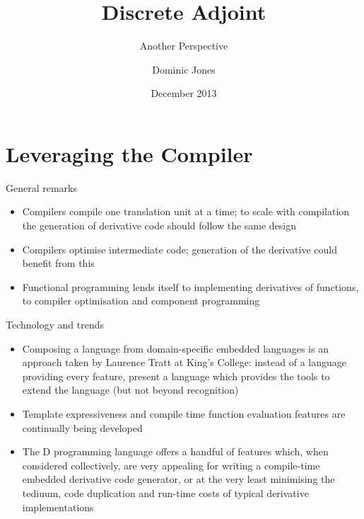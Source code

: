 \documentclass[xcolor=dvipsnames]{beamer}
\title{Discrete Adjoint}
\subtitle{Another Perspective}
\author{Dominic Jones}
\date{December 2013}
\begin{document}
\begin{frame}[plain]
  \titlepage
\end{frame}


\section{Leveraging the Compiler}


\begin{frame}{General remarks}
\begin{itemize}
\item Compilers compile one translation unit at a time; to scale with compilation the generation of derivative code should follow the same design \vspace{5mm}
\item Compilers optimise intermediate code; generation of the derivative could benefit from this \vspace{5mm}
\item Functional programming lends itself to implementing derivatives of functions, to compiler optimisation and component programming
\end{itemize}
\end{frame}


\begin{frame}{Technology and trends}
\begin{itemize}
\item Composing a language from domain-specific embedded languages is an approach taken by Laurence Tratt at King’s College: instead of a language providing every feature, present a language which provides the tools to extend the language (but not beyond recognition) \vspace{5mm}
\item Template expressiveness and compile time function evaluation features are continually being developed \vspace{5mm}
\item The D programming language offers a handful of features which, when considered collectively, are very appealing for writing a compile-time embedded derivative code generator, or at the very least minimising the tediuum, code duplication and run-time costs of typical derivative implementations
\end{itemize}
\end{frame}
\end{document}
